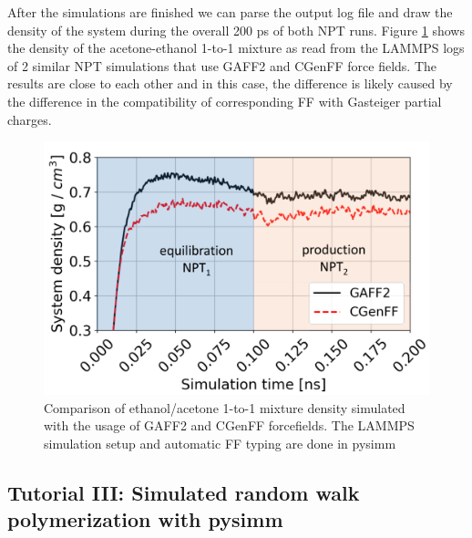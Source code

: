 \documentclass[9pt,tutorial]{livecoms}
\begin{document}
After the simulations are finished we can parse the output log file and draw the density of the system during the overall 200 ps of both NPT runs. Figure \ref{ff-diff} shows the density of the  acetone-ethanol 1-to-1 mixture as read from the LAMMPS logs of 2 similar NPT simulations that use GAFF2 and CGenFF force fields. The results are close to each other and in this case, the difference is likely caused by the difference in the compatibility of corresponding FF with Gasteiger partial charges. 

\begin{figure}[htbp]
  \centering
    \includegraphics[width=0.9\columnwidth]{figures/figure5}
    \caption{Comparison of ethanol/acetone 1-to-1 mixture density simulated with the usage of GAFF2 and CGenFF forcefields. The LAMMPS simulation setup and automatic FF typing are done in pysimm}
    \label{ff-diff}
\end{figure}

\subsection{Tutorial III: Simulated random walk polymerization with pysimm}
\end{document}
